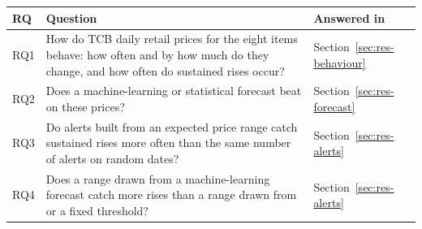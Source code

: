 \begin{tabularx}{\linewidth}{lXl}
\toprule
\textbf{RQ} & \textbf{Question} & \textbf{Answered in} \\
\midrule
RQ1 & How do TCB daily retail prices for the eight items behave: how often and by how much do they change, and how often do sustained rises occur? & Section~\ref{sec:res-behaviour} \\
RQ2 & Does a machine-learning or statistical forecast beat \naive{} on these prices? & Section~\ref{sec:res-forecast} \\
RQ3 & Do alerts built from an expected price range catch sustained rises more often than the same number of alerts on random dates? & Section~\ref{sec:res-alerts} \\
RQ4 & Does a range drawn from a machine-learning forecast catch more rises than a range drawn from \naive{} or a fixed threshold? & Section~\ref{sec:res-alerts} \\
\bottomrule
\end{tabularx}
